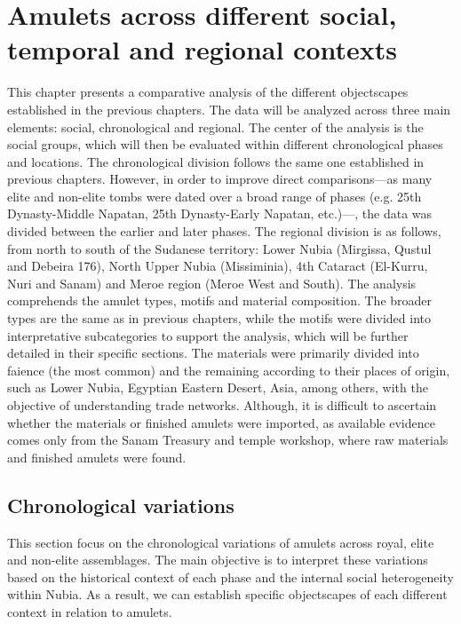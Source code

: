 \chapter{Amulets across different social, temporal and regional contexts}


This chapter presents a comparative analysis of the different objectscapes established in the previous chapters. The data will be analyzed across three main elements: social, chronological and regional. The center of the analysis is the social groups, which will then be evaluated within different chronological phases and locations. The chronological division follows the same one established in previous chapters. However, in order to improve direct comparisons---as many elite and non-elite tombs were dated over a broad range of phases (e.g. 25th Dynasty-Middle Napatan, 25th Dynasty-Early Napatan, etc.)---, the data was divided between the earlier and later phases. The regional division is as follows, from north to south of the Sudanese territory: Lower Nubia (Mirgissa, Qustul and Debeira 176), North Upper Nubia (Missiminia), 4th Cataract (El-Kurru, Nuri and Sanam) and Meroe region (Meroe West and South). The analysis comprehends the amulet types, motifs and material composition. The broader types are the same as in previous chapters, while the motifs were divided into interpretative subcategories to support the analysis, which will be further detailed in their specific sections. The materials were primarily divided into faience (the most common) and the remaining according to their places of origin, such as Lower Nubia, Egyptian Eastern Desert, Asia, among others, with the objective of understanding trade networks. Although, it is difficult to ascertain whether the materials or finished amulets were imported, as available evidence comes only from the Sanam Treasury and temple workshop, where raw materials and finished amulets were found.


\section{Chronological variations}


This section focus on the chronological variations of amulets across royal, elite and non-elite assemblages. The main objective is to interpret these variations based on the historical context of each phase and the internal social heterogeneity within Nubia. As a result, we can establish specific objectscapes of each different context in relation to amulets.


